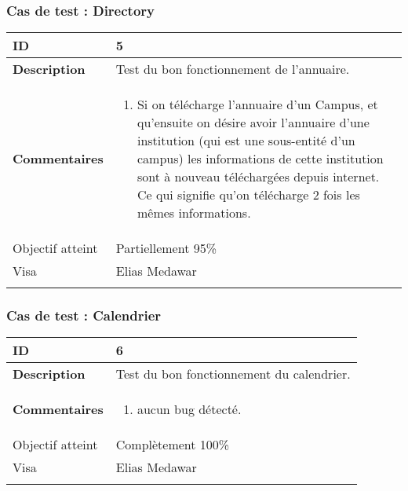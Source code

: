 		 		 \subsubsection*{Cas de test : Directory}
		 		 		 		 		 \begin{longtable}{m{4cm}|p{10cm}|}
		 		 		 		 		 \textbf{ ID} & 5 \\
		 		 		 		 		 \hline \textbf{Description} &  Test du bon fonctionnement de l'annuaire.\\
		 		 		 		 		 \hline \textbf{Commentaires} &  
		 		 		 		 		 	 	 \begin{enumerate}
					 		 	 		 		 		 	 		\item Si on télécharge l'annuaire d'un Campus, et qu'ensuite on désire avoir l'annuaire d'une institution (qui est une sous-entité d'un campus) les informations de cette institution sont à nouveau téléchargées depuis internet. Ce qui signifie qu'on télécharge 2 fois les mêmes informations.
					 		 	 		 					 	\end{enumerate} \\
		 		 	 		 		 		 \hline Objectif atteint & {\color{orange} Partiellement 95\% \XBox } \\
					 		 	 		 		 		\hline Visa & Elias Medawar 	\\
					 		 		 		 		\\
		 		 		 		 \end{longtable}

		 		 \subsubsection*{Cas de test : Calendrier}
		 		 		 		 		 \begin{longtable}{m{4cm}|p{10cm}|}
		 		 		 		 		 \textbf{ ID} & 6 \\
		 		 		 		 		 \hline \textbf{Description} &  Test du bon fonctionnement du calendrier.\\
		 		 		 		 		 \hline \textbf{Commentaires} &  
		 		 		 		 		 	 	 \begin{enumerate}
					 		 	 		 		 		 	 		\item aucun bug détecté.
					 		 	 		 					 	\end{enumerate} \\
		 		 	 		 		 		 \hline Objectif atteint & {\color{green} Complètement 100\% \CheckedBox } \\
					 		 	 		 		 		\hline Visa & Elias Medawar 	\\
					 		 		 		 		\\
		 		 		 		 \end{longtable} 
